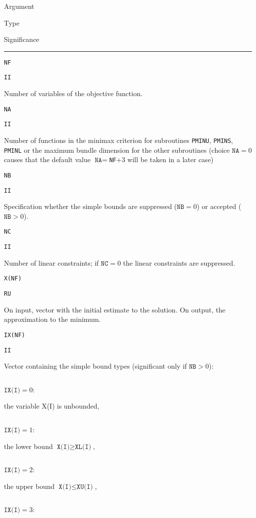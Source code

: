 \documentclass{article}
\begin{document}
{\small

\noindent\parbox{20mm}{Argument}\parbox{10mm}{$\!$Type}\parbox[t]{91mm}
  {Significance}\par\noindent\rule[1mm]{121mm}{.4pt}
  \par
\noindent\parbox{20mm}{\texttt{NF}}\parbox{10mm}{\texttt{II}}\parbox[t]{91mm}{
  Number of variables of the objective function.}
  \par\vspace{2mm}
\noindent\parbox{20mm}{\texttt{NA}}\parbox{10mm}{\texttt{II}}\parbox[t]{91mm}{
  Number of functions in the minimax
  criterion for subroutines {\tt PMINU}, {\tt PMINS}, {\tt PMINL} or the maximum bundle
  dimension for the other subroutines (choice $\texttt{NA}=0$ causes that the
  default value $\texttt{NA}=$\texttt{NF}+3 will be taken in a later case)}
  \par\vspace{2mm}
\noindent\parbox{20mm}{\texttt{NB}}\parbox{10mm}{\texttt{II}}\parbox[t]{91mm}{
  Specification whether the simple bounds are suppressed
  ($\texttt{NB}=0$) or accepted ($\texttt{NB}>0$).}
  \par\vspace{2mm}
\noindent\parbox{20mm}{\texttt{NC}}\parbox{10mm}{\texttt{II}}\parbox[t]{91mm}{
  Number of linear constraints; if $\texttt{NC}=0$ the linear constraints
  are suppressed.}
  \par\vspace{2mm}
\noindent\parbox{20mm}{\texttt{X(NF)}}\parbox{10mm}{\texttt{RU}}\parbox[t]{91mm}{
  On input, vector with the initial estimate to the solution.
  On output, the approximation to the minimum.}
  \par\vspace{2mm}
\noindent\parbox{20mm}{\texttt{IX(NF)}}\parbox{10mm}{\texttt{II}}\parbox[t]{91mm}{
  Vector containing the simple bound types (significant only if
  $\texttt{NB}>0$):}
  \par\vspace{1mm}
\noindent\parbox{30mm}{$\;$}\parbox{20mm}{$\texttt{IX(I)}=0$:}\parbox[t]{71mm}{
  the variable X(I) is unbounded,}
  \par
\noindent\parbox{30mm}{$\;$}\parbox{20mm}{$\texttt{IX(I)}=1$:}\parbox[t]{71mm}{
  the lower bound $\texttt{X(I)}\ge\texttt{XL(I)}$,}
  \par
\noindent\parbox{30mm}{$\;$}\parbox{20mm}{$\texttt{IX(I)}=2$:}\parbox[t]{71mm}{
  the upper bound $\texttt{X(I)}\le\texttt{XU(I)}$,}
  \par
\noindent\parbox{30mm}{$\;$}\parbox{20mm}{$\texttt{IX(I)}=3$:}\parbox[t]{71mm}{
}}
\end{document}
